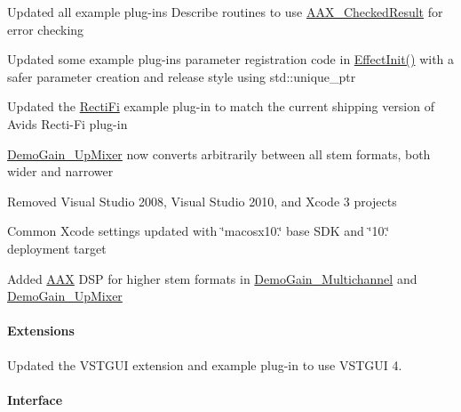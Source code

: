 \begin{DoxyItemize}
\item Updated all example plug-\/ins\textquotesingle{} Describe routines to use \mbox{\hyperlink{a01601}{A\+A\+X\+\_\+\+Checked\+Result}} for error checking  
\item Updated some example plug-\/ins\textquotesingle{} parameter registration code in \mbox{\hyperlink{a01481_a2e302fd758d39a6a855023bf825fe148}{Effect\+Init()}} with a safer parameter creation and release style using std\+::unique\+\_\+ptr  
\item Updated the \mbox{\hyperlink{a00848_RectiFi}{Recti\+Fi}} example plug-\/in to match the current shipping version of Avid\textquotesingle{}s Recti-\/\+Fi plug-\/in  
\item \mbox{\hyperlink{a00848_DemoGain_UpMixer}{Demo\+Gain\+\_\+\+Up\+Mixer}} now converts arbitrarily between all stem formats, both wider and narrower  
\item Removed Visual Studio 2008, Visual Studio 2010, and Xcode 3 projects  
\item Common Xcode settings updated with \char`\"{}macosx10.\char`\"{} base S\+DK and \char`\"{}10.\char`\"{} deployment target  
\item Added \mbox{\hyperlink{a00852}{A\+AX}} D\+SP for higher stem formats in \mbox{\hyperlink{a00848_DemoGain_Multichannel}{Demo\+Gain\+\_\+\+Multichannel}} and \mbox{\hyperlink{a00848_DemoGain_UpMixer}{Demo\+Gain\+\_\+\+Up\+Mixer}}  
\end{DoxyItemize}\hypertarget{a00847_aax_sdk_2p3p1_Extensions}{}\paragraph{Extensions}\label{a00847_aax_sdk_2p3p1_Extensions}

\begin{DoxyItemize}
\item Updated the V\+S\+T\+G\+UI extension and example plug-\/in to use V\+S\+T\+G\+UI 4.  
\end{DoxyItemize}\hypertarget{a00847_aax_sdk_2p3p1_Interface}{}\paragraph{Interface}\label{a00847_aax_sdk_2p3p1_Interface}

